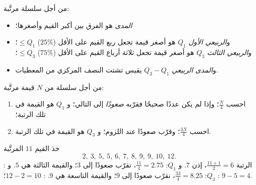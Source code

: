 \begin{definition}\label{def:g10:stats:quartiles}
من أجل سلسلة مرتَّبة:
\begin{itemize}
  \item \emph{المدى} هو الفرق بين
        أكبر القيم وأصغرها؛
  \item و\emph{الربيعي الأول} $Q_1$ هو أصغر
        قيمة تجعل ربع القيم على الأقل ($25\%$)
        $\leq Q_1$؛ و\emph{الربيعي الثالث} $Q_3$ هو أصغر قيمة
        تجعل ثلاثة أرباع القيم على الأقل ($75\%$)
        $\leq Q_3$؛
  \item و\emph{المدى الربيعي} $Q_3 - Q_1$ يقيس تشتت
        النصف المركزي من المعطيات.
\end{itemize}
\end{definition}

\begin{method}\label{met:g10:stats:quartiles}
من أجل سلسلة من $N$ قيمة مرتَّبة:
\begin{enumerate}
  \item احسب $\frac N4$؛ وإذا لم يكن عددًا صحيحًا فقرّبه \emph{صعودًا}
        إلى  التالي؛ و $Q_1$ هو القيمة في تلك الرتبة؛
  \item احسب $\frac{3N}{4}$؛ وقرّب صعودًا عند اللزوم؛ و $Q_3$ هو القيمة في
        تلك الرتبة.
\end{enumerate}
\end{method}

\begin{example}\label{ex:g10:stats:quartiles}
خذ القيم $11$ المرتَّبة
\[
2,\ 3,\ 5,\ 5,\ 6,\ 7,\ 8,\ 9,\ 9,\ 10,\ 12 .
\]
: الرتبة $\frac{11+1}{2} = 6$، إذن  $7$.
و $Q_1$: $\frac{11}{4} = 2.75$، نقرّب صعودًا إلى $3$؛ والقيمة الثالثة هي $5$.
و $Q_3$: $\frac{33}{4} = 8.25$، نقرّب صعودًا إلى $9$؛ والقيمة التاسعة هي $9$.
: $12 - 2 = 10$؛ : $9 - 5 = 4$.
\end{example}

